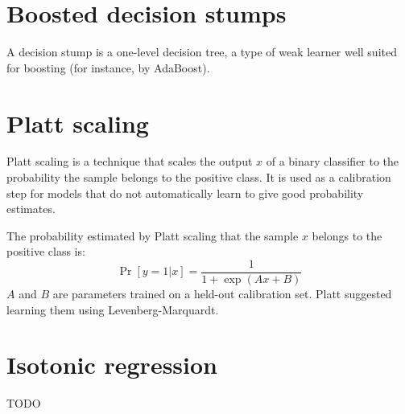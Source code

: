 \section{Boosted decision stumps}
\label{boosted-decision-stumps}
A decision stump is a one-level decision tree, a type of weak learner
well suited for boosting (for instance, by AdaBoost).

\section{Platt scaling}
\label{platt-scaling}

Platt scaling\cite{platt-scaling} is a technique that scales the output $x$ of a binary classifier
to the probability the sample belongs to the positive class. It is used as a
calibration step for models that do not automatically learn to give good
probability estimates.

The probability estimated by Platt scaling that the sample $x$ belongs to the
positive class is:
$$\Pr[y=1|x] = \frac{1}{1+\exp(Ax+B)}$$
$A$ and $B$ are parameters trained on a held-out calibration set.
Platt suggested learning them using Levenberg-Marquardt.

\section{Isotonic regression}
TODO
